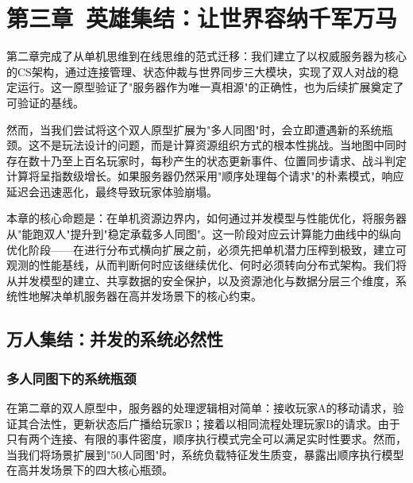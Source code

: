 \section{第三章\ 英雄集结：让世界容纳千军万马} 

第二章完成了从单机思维到在线思维的范式迁移：我们建立了以权威服务器为核心的CS架构，通过连接管理、状态仲裁与世界同步三大模块，实现了双人对战的稳定运行。这一原型验证了"服务器作为唯一真相源"的正确性，也为后续扩展奠定了可验证的基线。

然而，当我们尝试将这个双人原型扩展为"多人同图"时，会立即遭遇新的系统瓶颈。这不是玩法设计的问题，而是计算资源组织方式的根本性挑战。当地图中同时存在数十乃至上百名玩家时，每秒产生的状态更新事件、位置同步请求、战斗判定计算将呈指数级增长。如果服务器仍然采用"顺序处理每个请求"的朴素模式，响应延迟会迅速恶化，最终导致玩家体验崩塌。

本章的核心命题是：在单机资源边界内，如何通过并发模型与性能优化，将服务器从"能跑双人"提升到"稳定承载多人同图"。这一阶段对应云计算能力曲线中的纵向优化阶段——在进行分布式横向扩展之前，必须先把单机潜力压榨到极致，建立可观测的性能基线，从而判断何时应该继续优化、何时必须转向分布式架构。我们将从并发模型的建立、共享数据的安全保护，以及资源池化与数据分层三个维度，系统性地解决单机服务器在高并发场景下的核心约束。

\subsection{万人集结：并发的系统必然性}
% 

\subsubsection{多人同图下的系统瓶颈}

在第二章的双人原型中，服务器的处理逻辑相对简单：接收玩家A的移动请求，验证其合法性，更新状态后广播给玩家B；接着以相同流程处理玩家B的请求。由于只有两个连接、有限的事件密度，顺序执行模式完全可以满足实时性要求。然而，当我们将场景扩展到"50人同图"时，系统负载特征发生质变，暴露出顺序执行模型在高并发场景下的四大核心瓶颈。

